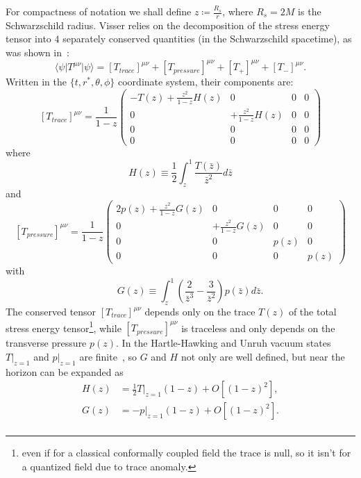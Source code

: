 For compactness of notation we shall define \(z \coloneqq \frac{R_s}{r}\), where \(R_s = 2M\) is the Schwarzschild radius.
Visser relies on the decomposition of the stress energy tensor into \(4\) separately conserved quantities (in the Schwarzschild spacetime), as was shown in~\cite[]{christensen1977trace}: 
\[
    \langle\psi\vert T^{\mu\nu}\vert\psi\rangle = \left[T_{trace}\right]^{\mu\nu} + \left[T_{pressure}\right]^{\mu\nu} +
    \left[T_{+}\right]^{\mu\nu} + \left[T_{-}\right]^{\mu\nu}.
\]
Written in the \(\{t, r^*, \theta, \phi\}\) coordinate system, their components are:
\[
    \left[T_{trace}\right]^{\mu\nu} = \frac{1}{1 - z}\begin{pmatrix}
        -T(z) + \frac{z^2}{1 - z}H(z) & 0 & 0 & 0 \\
        0 & + \frac{z^2}{1 - z}H(z) & 0 & 0 \\
        0 & 0 & 0 & 0 \\
        0 & 0 & 0 & 0
    \end{pmatrix} 
\]
where 
\[
    H(z)\equiv \frac{1}{2}\int_{z}^{1} \frac{T(\bar{z})}{\bar{z}^2}d\bar{z}    
\]
and 
\[
    \left[T_{pressure}\right]^{\mu\nu} = \frac{1}{1 - z}
    \begin{pmatrix}
        2p(z) + \frac{z^2}{1 - z}G(z) & 0 & 0 & 0 \\
        0 & + \frac{z^2}{1 - z}G(z) & 0 & 0 \\
        0 & 0 & p(z) & 0 \\
        0 & 0 & 0 & p(z)
    \end{pmatrix} 
\]
with 
\[
    \quad \quad G(z)\equiv \int_{z}^{1} \left(\frac{2}{\bar{z}^3} - \frac{3}{\bar{z}^2}\right)p(\bar{z})d\bar{z}.    
\]
The conserved tensor \(\left[T_{trace}\right]^{\mu\nu}\) depends only on the trace \(T(z)\) of the total stress energy tensor\footnote{even if for a classical conformally coupled field the trace is null, so it isn't for a quantized field due to trace anomaly.}, while \(\left[T_{pressure}\right]^{\mu\nu}\) is traceless and only depends on the transverse pressure \(p(z)\). In the Hartle-Hawking and Unruh vacuum states \(T\vert_{z = 1}\) and \(p\vert_{z = 1}\) are finite~\cite[]{christensen1977trace,jensen1991renormalized}, so \(G\) and \(H\) not only are well defined, but near the horizon can be expanded as 
\begin{align*}
    H(z) &= \frac{1}{2}T\vert_{z = 1}(1 - z) + O[(1 - z)^2],\\
    G(z) &= -p\vert_{z = 1}(1 - z) + O[(1 - z)^2].\\
\end{align*}

